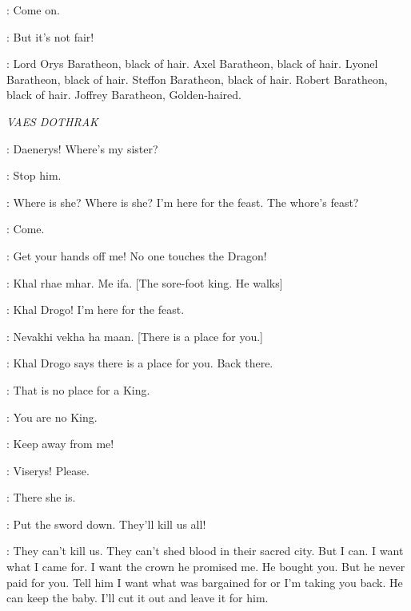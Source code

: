 \ARYA:  Come on.

\SANSA:  But it's not fair! 


\NED:  Lord Orys Baratheon, black of hair. Axel Baratheon, black of hair. Lyonel Baratheon, black of hair. Steffon Baratheon, black of hair.  Robert Baratheon, black of hair. Joffrey Baratheon, Golden-haired.  


\scene

\textit{VAES DOTHRAK} 


\VISERYS:  Daenerys!  Where's my sister? 

\DAENERYS:  Stop him. 

\VISERYS:  Where is she? Where is she?  I'm here for the feast. The whore's feast? 


\JORAH:  Come. 

\VISERYS:  Get your hands off me! No one touches the Dragon! 

\QOTHO: Khal rhae mhar. Me ifa. [The sore-foot king. He walks] 

\VISERYS: Khal Drogo! I'm here for the feast.

\DROGO: Nevakhi vekha ha maan. [There is a place for you.] 

\JORAH:  Khal Drogo says there is a place for you.  Back there. 

\VISERYS:  That is no place for a King. 

\DROGO:  You are no King. 


\VISERYS: Keep away from me! 

\DAENERYS:  Viserys! Please. 

\VISERYS:  There she is. 

\JORAH:  Put the sword down. They'll kill us all! 

\VISERYS:  They can't kill us. They can't shed blood in their sacred city. But I can. I want what I came for. I want the crown he promised me. He bought you. But he never paid for you. Tell him I want what was bargained for or I'm taking you back. He can keep the baby. I'll cut it out and leave it for him. 

